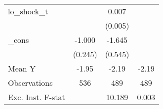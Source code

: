 {\begin{tabular}{l*{3}{c}}
\addlinespace
lo\_shock\_t  &                     &       0.007         &                     \\
            &                     &     (0.005)         &                     \\
\addlinespace
\_cons      &      -1.000\sym{***}&      -1.645\sym{***}&                     \\
            &     (0.245)         &     (0.545)         &                     \\
\midrule
Mean Y      &       -1.95         &       -2.19         &       -2.19         \\
Observations&         536         &         489         &         489         \\
Exc. Inst. F-stat&                     &      10.189         &       0.003         \\
\bottomrule
\end{tabular}
}

